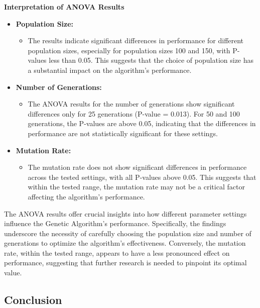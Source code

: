 \documentclass{article}
\begin{document}
    \textbf{Interpretation of ANOVA Results}

    \begin{itemize}
        \item \textbf{Population Size:}
        \begin{itemize}
            \item The results indicate significant differences in performance for different population sizes, especially for population sizes 100 and 150, with P-values less than 0.05. This suggests that the choice of population size has a substantial impact on the algorithm's performance.
        \end{itemize}
        \item \textbf{Number of Generations:}
        \begin{itemize}
            \item The ANOVA results for the number of generations show significant differences only for 25 generations (P-value = 0.013). For 50 and 100 generations, the P-values are above 0.05, indicating that the differences in performance are not statistically significant for these settings.
        \end{itemize}
        \item \textbf{Mutation Rate:}
        \begin{itemize}
            \item The mutation rate does not show significant differences in performance across the tested settings, with all P-values above 0.05. This suggests that within the tested range, the mutation rate may not be a critical factor affecting the algorithm's performance.
        \end{itemize}
    \end{itemize}

    The ANOVA results offer crucial insights into how different parameter settings influence the Genetic Algorithm's performance. Specifically, the findings underscore the necessity of carefully choosing the population size and number of generations to optimize the algorithm's effectiveness. Conversely, the mutation rate, within the tested range, appears to have a less pronounced effect on performance, suggesting that further research is needed to pinpoint its optimal value.

    \subsection{Conclusion}
\end{document}
